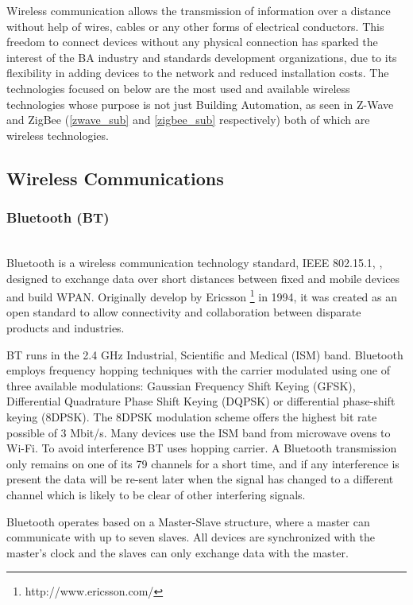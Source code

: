 Wireless communication allows the transmission of information over a distance without help of wires, cables or any other forms of electrical conductors. This freedom to connect devices without any physical connection has sparked the interest of the BA industry and standards development organizations, due to its flexibility in adding devices to the network and reduced installation costs. 
The technologies focused on below are the most used and available wireless technologies whose purpose is not just Building Automation, as seen in Z-Wave and ZigBee (\ref{zwave_sub} and \ref{zigbee_sub} respectively) both of which are wireless technologies. 


\subsection{Wireless Communications}

\subsubsection{Bluetooth (BT)}\mbox{}\\

Bluetooth is a wireless communication technology standard, IEEE 802.15.1, \cite{std_802.15.1,comunication:bt,comunication:bt_specification}, designed to exchange data over short distances between fixed and mobile devices and build WPAN. Originally develop by Ericsson \footnote{http://www.ericsson.com/} in 1994, it was created as an open standard to allow connectivity and collaboration between disparate products and industries.

BT runs in the 2.4 GHz Industrial, Scientific and Medical (ISM) band. Bluetooth employs frequency hopping techniques with the carrier modulated using one of three available modulations: Gaussian Frequency Shift Keying (GFSK), Differential Quadrature Phase Shift Keying (DQPSK) or differential phase-shift keying (8DPSK). The 8DPSK modulation scheme offers the highest bit rate possible of 3  Mbit/s. Many devices use the ISM band from microwave ovens to Wi-Fi. To avoid interference BT uses hopping carrier. A Bluetooth transmission only remains on one of its 79 channels for a short time, and if any interference is present the data will be re-sent later when the signal has changed to a different channel which is likely to be clear of other interfering signals.

Bluetooth operates based on a Master-Slave structure, where a master can communicate with up to seven slaves. All devices are synchronized with the master's clock and the slaves can only exchange data with the master.

